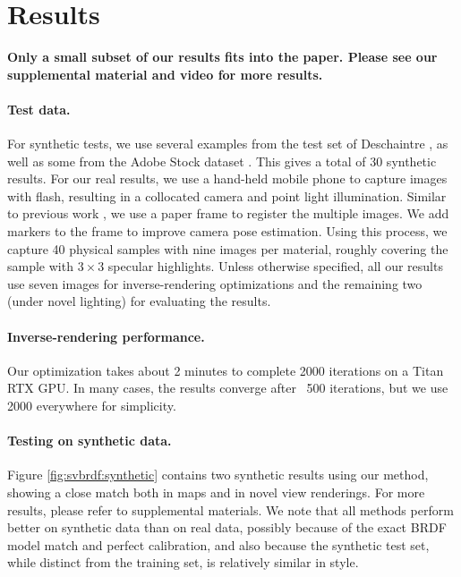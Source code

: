 \section{Results}
\label{sec:svbrdf:results}

\textbf{Only a small subset of our results fits into the paper. Please see our supplemental material and video for more results.}

\paragraph{Test data.}
For synthetic tests, we use several examples from the test set of Deschaintre \cite{Deschaintre2018}, as well as some from the Adobe Stock dataset \cite{Li2018}. This gives a total of 30 synthetic results.
For our real results, we use a hand-held mobile phone to capture images with flash, resulting in a collocated camera and point light illumination.
Similar to previous work \cite{Hui2017,Deschaintre2019}, we use a paper frame to register the multiple images.
We add markers to the frame to improve camera pose estimation.
Using this process, we capture 40 physical samples with nine images per material, roughly covering the sample with $3 \times 3$ specular highlights. 
Unless otherwise specified, all our results use seven images for inverse-rendering optimizations and the remaining two (under novel lighting) for evaluating the results.

\paragraph{Inverse-rendering performance.}
Our optimization takes about 2 minutes to complete 2000 iterations on a Titan RTX GPU. In many cases, the results converge after ~500 iterations, but we use 2000 everywhere for simplicity.



\paragraph{Testing on synthetic data.}
Figure \ref{fig:svbrdf:synthetic} contains two synthetic results using our method, showing a close match both in maps and in novel view renderings. For more results, please refer to supplemental materials. We note that all methods perform better on synthetic data than on real data, possibly because of the exact BRDF model match and perfect calibration, and also
because the synthetic test set, while distinct from the training set, is relatively similar in style.

